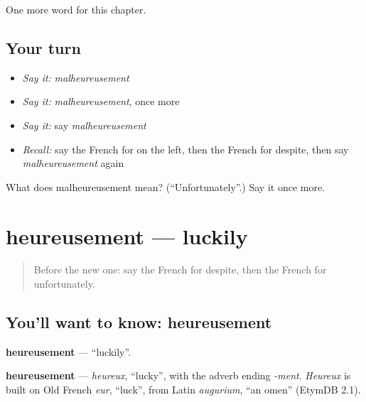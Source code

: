 \begin{grammarlens}[title={What you've built}]
One more word for this chapter.
\end{grammarlens}

\subsection*{Your turn}
\begin{itemize}
\raggedright
  \item \emph{Say it:} \emph{malheureusement}
  \item \emph{Say it:} \emph{malheureusement}, once more
  \item \emph{Say it:} say \emph{malheureusement}
  \item \emph{Recall:} say the French for on the left, then the French for despite, then say \emph{malheureusement} again
\end{itemize}

\begin{tcolorbox}[breakable,colback=teal!4,colframe=teal!35!black,title={Before you move on}]
What does malheureusement mean? (\textquotedblleft{}Unfortunately\textquotedblright{}.) Say it once more.
\end{tcolorbox}
\section[heureusement]{heureusement — luckily}

\label{lesson:FR-C189-heureusement}



\begin{quote}
Before the new one: say the French for despite, then the French for unfortunately.
\end{quote}

\subsection*{You'll want to know: heureusement}
\textbf{heureusement} — \textquotedblleft{}luckily\textquotedblright{}.

\begin{cousinweb}
\textbf{heureusement} — \emph{heureux}, \textquotedblleft{}lucky\textquotedblright{}, with the adverb ending \emph{-ment}. \emph{Heureux} is built on Old French \emph{eur}, \textquotedblleft{}luck\textquotedblright{}, from Latin \emph{augurium}, \textquotedblleft{}an omen\textquotedblright{} (EtymDB 2.1).
\end{cousinweb}

